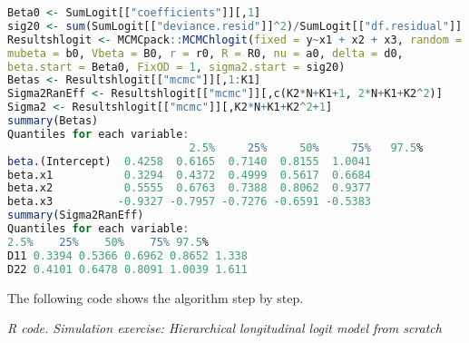 \begin{enumerate}[leftmargin=*]
\begin{tcolorbox}[enhanced,width=4.67in,center upper,
	fontupper=\large\bfseries,drop shadow southwest,sharp corners]
\begin{VF}
\begin{lstlisting}[language=R]
Beta0 <- SumLogit[["coefficients"]][,1]
sig20 <- sum(SumLogit[["deviance.resid"]]^2)/SumLogit[["df.residual"]]
Resultshlogit <- MCMCpack::MCMChlogit(fixed = y~x1 + x2 + x3, random = ~w1, group="id", data = Data, burnin = burnin, mcmc = mcmc, thin = thin, 
mubeta = b0, Vbeta = B0, r = r0, R = R0, nu = a0, delta = d0,
beta.start = Beta0, FixOD = 1, sigma2.start = sig20)
Betas <- Resultshlogit[["mcmc"]][,1:K1]
Sigma2RanEff <- Resultshlogit[["mcmc"]][,c(K2*N+K1+1, 2*N+K1+K2^2)]
Sigma2 <- Resultshlogit[["mcmc"]][,K2*N+K1+K2^2+1]
summary(Betas)
Quantiles for each variable:
							2.5%     25%     50%     75%   97.5%
beta.(Intercept)  0.4258  0.6165  0.7140  0.8155  1.0041
beta.x1           0.3294  0.4372  0.4999  0.5617  0.6684
beta.x2           0.5555  0.6763  0.7388  0.8062  0.9377
beta.x3          -0.9327 -0.7957 -0.7276 -0.6591 -0.5383
summary(Sigma2RanEff)
Quantiles for each variable:
2.5%    25%    50%    75% 97.5%
D11 0.3394 0.5366 0.6962 0.8652 1.338
D22 0.4101 0.6478 0.8091 1.0039 1.611
\end{lstlisting}
	\end{VF}
\end{tcolorbox}

The following code shows the algorithm step by step.

\begin{tcolorbox}[enhanced,width=4.67in,center upper,
	fontupper=\large\bfseries,drop shadow southwest,sharp corners]
	\textit{R code. Simulation exercise: Hierarchical longitudinal logit model from scratch}
	\begin{VF}
		\begin{lstlisting}[language=R]

		\end{lstlisting}
	\end{VF}
\end{tcolorbox}


\end{enumerate}